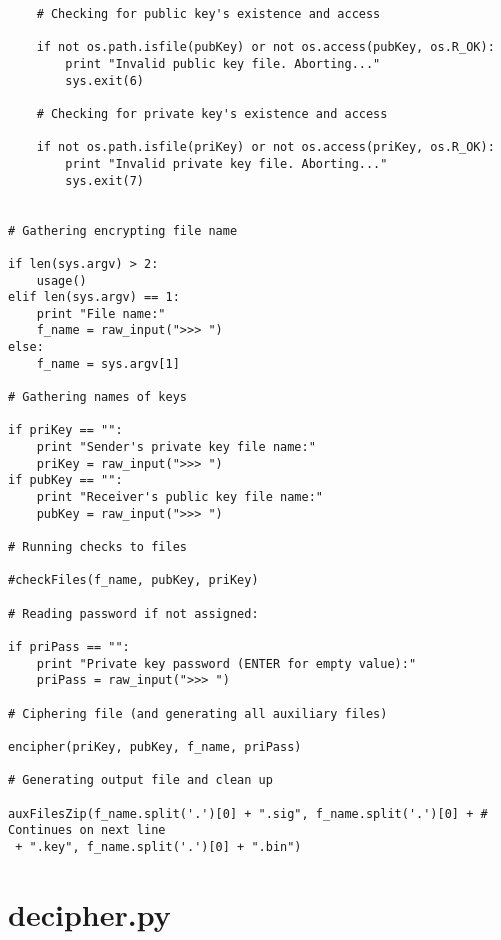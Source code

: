 \documentclass[a4paper,11pt,openright,oneside]{report}
\begin{document}
\begin{verbatim}
    # Checking for public key's existence and access

    if not os.path.isfile(pubKey) or not os.access(pubKey, os.R_OK):
        print "Invalid public key file. Aborting..."
        sys.exit(6)

    # Checking for private key's existence and access

    if not os.path.isfile(priKey) or not os.access(priKey, os.R_OK):
        print "Invalid private key file. Aborting..."
        sys.exit(7)


# Gathering encrypting file name

if len(sys.argv) > 2:
    usage()
elif len(sys.argv) == 1:
    print "File name:"
    f_name = raw_input(">>> ")
else:
    f_name = sys.argv[1]

# Gathering names of keys

if priKey == "":
    print "Sender's private key file name:"
    priKey = raw_input(">>> ")
if pubKey == "":
    print "Receiver's public key file name:"
    pubKey = raw_input(">>> ")

# Running checks to files

#checkFiles(f_name, pubKey, priKey)

# Reading password if not assigned:

if priPass == "":
    print "Private key password (ENTER for empty value):"
    priPass = raw_input(">>> ")

# Ciphering file (and generating all auxiliary files)

encipher(priKey, pubKey, f_name, priPass)

# Generating output file and clean up

auxFilesZip(f_name.split('.')[0] + ".sig", f_name.split('.')[0] + # Continues on next line
 + ".key", f_name.split('.')[0] + ".bin")
\end{verbatim}

\newpage
\section*{decipher.py}
\label{App:decipher.py}
\end{document}
